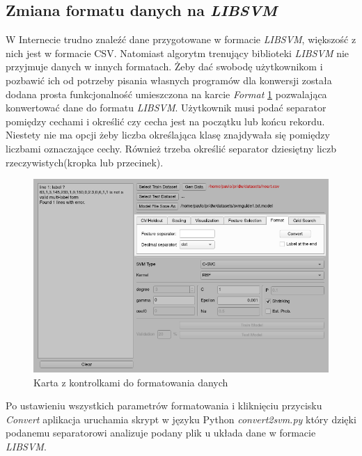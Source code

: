 \documentclass[paper=a4, fontsize=11pt]{scrartcl} %
\numberwithin{equation}{section} %
\numberwithin{figure}{section} %
\begin{document}
\subsection{Zmiana formatu danych na \textit{LIBSVM}}
    \par W Internecie trudno znaleźć dane przygotowane w formacie \textit{LIBSVM}, większość z
    nich jest w formacie CSV. Natomiast algorytm trenujący biblioteki \textit{LIBSVM} nie
    przyjmuje danych w innych formatach. Żeby dać swobodę użytkownikom i pozbawić ich od
    potrzeby pisania własnych programów dla konwersji została dodana prosta funkcjonalność
    umieszczona na karcie \textit{Format} \ref{fig:format} pozwalająca konwertować dane do
    formatu \textit{LIBSVM}. Użytkownik musi podać separator pomiędzy cechami i określić czy
    cecha jest na początku lub końcu rekordu. Niestety nie ma opcji żeby liczba określająca
    klasę znajdywała się pomiędzy liczbami oznaczające cechy. Również trzeba określić separator
    dziesiętny liczb rzeczywistych(kropka lub przecinek).

    \begin{figure}[H]
        \begin{center}
            \includegraphics[scale=0.7]{./img/svm_app_format.png}
            \caption{Karta z kontrolkami do formatowania danych}
            \label{fig:format}
        \end{center}
    \end{figure}

    \par Po ustawieniu wszystkich parametrów formatowania i kliknięciu przycisku
    \textit{Convert} aplikacja uruchamia skrypt w języku Python \textit{convert2svm.py} który
    dzięki podanemu separatorowi analizuje podany plik u układa dane w formacie
    \textit{LIBSVM}.
\end{document}
